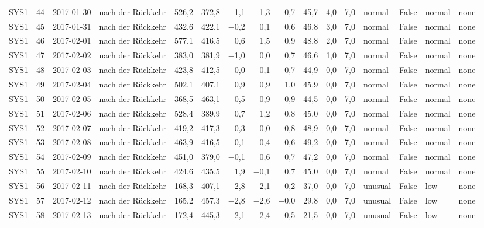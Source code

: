 \begin{tabular}{lrllrrrrrrrrlrll}
SYS1 & 44 & 2017-01-30 & nach der Rückkehr & 526,2 & 372,8 & 1,1 & 1,3 & 0,7 & 45,7 & 4,0 & 7,0 & normal & False & normal & none \\
SYS1 & 45 & 2017-01-31 & nach der Rückkehr & 432,6 & 422,1 & $-$0,2 & 0,1 & 0,6 & 46,8 & 3,0 & 7,0 & normal & False & normal & none \\
SYS1 & 46 & 2017-02-01 & nach der Rückkehr & 577,1 & 416,5 & 0,6 & 1,5 & 0,9 & 48,8 & 2,0 & 7,0 & normal & False & normal & none \\
SYS1 & 47 & 2017-02-02 & nach der Rückkehr & 383,0 & 381,9 & $-$1,0 & 0,0 & 0,7 & 46,6 & 1,0 & 7,0 & normal & False & normal & none \\
SYS1 & 48 & 2017-02-03 & nach der Rückkehr & 423,8 & 412,5 & 0,0 & 0,1 & 0,7 & 44,9 & 0,0 & 7,0 & normal & False & normal & none \\
SYS1 & 49 & 2017-02-04 & nach der Rückkehr & 502,1 & 407,1 & 0,9 & 0,9 & 1,0 & 45,9 & 0,0 & 7,0 & normal & False & normal & none \\
SYS1 & 50 & 2017-02-05 & nach der Rückkehr & 368,5 & 463,1 & $-$0,5 & $-$0,9 & 0,9 & 44,5 & 0,0 & 7,0 & normal & False & normal & none \\
SYS1 & 51 & 2017-02-06 & nach der Rückkehr & 528,4 & 389,9 & 0,7 & 1,2 & 0,8 & 45,0 & 0,0 & 7,0 & normal & False & normal & none \\
SYS1 & 52 & 2017-02-07 & nach der Rückkehr & 419,2 & 417,3 & $-$0,3 & 0,0 & 0,8 & 48,9 & 0,0 & 7,0 & normal & False & normal & none \\
SYS1 & 53 & 2017-02-08 & nach der Rückkehr & 463,9 & 416,5 & 0,1 & 0,4 & 0,6 & 49,2 & 0,0 & 7,0 & normal & False & normal & none \\
SYS1 & 54 & 2017-02-09 & nach der Rückkehr & 451,0 & 379,0 & $-$0,1 & 0,6 & 0,7 & 47,2 & 0,0 & 7,0 & normal & False & normal & none \\
SYS1 & 55 & 2017-02-10 & nach der Rückkehr & 424,6 & 435,5 & 1,9 & $-$0,1 & 0,7 & 45,0 & 0,0 & 7,0 & normal & False & normal & none \\
SYS1 & 56 & 2017-02-11 & nach der Rückkehr & 168,3 & 407,1 & $-$2,8 & $-$2,1 & 0,2 & 37,0 & 0,0 & 7,0 & unusual & False & low & none \\
SYS1 & 57 & 2017-02-12 & nach der Rückkehr & 165,2 & 457,3 & $-$2,8 & $-$2,6 & $-$0,0 & 29,8 & 0,0 & 7,0 & unusual & False & low & none \\
SYS1 & 58 & 2017-02-13 & nach der Rückkehr & 172,4 & 445,3 & $-$2,1 & $-$2,4 & $-$0,5 & 21,5 & 0,0 & 7,0 & unusual & False & low & none \\

\end{tabular}
